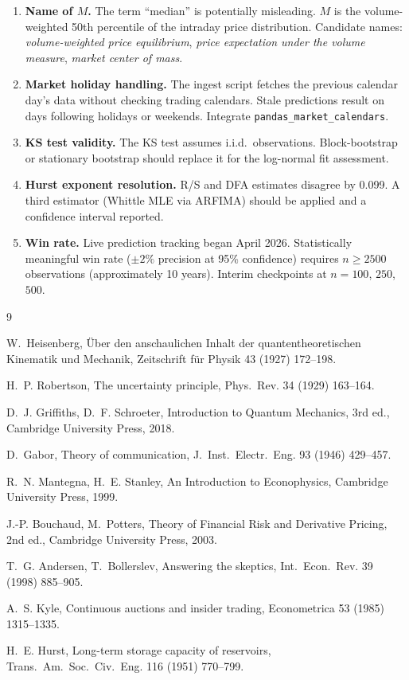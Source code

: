 \documentclass[preprint,12pt]{elsarticle}
\begin{document}
\begin{enumerate}
    \item \textbf{Name of $M$.} The term ``median'' is potentially misleading. $M$ is the volume-weighted 50th percentile of the intraday price distribution. Candidate names: \textit{volume-weighted price equilibrium}, \textit{price expectation under the volume measure}, \textit{market center of mass}.

    \item \textbf{Market holiday handling.} The ingest script fetches the previous calendar day's data without checking trading calendars. Stale predictions result on days following holidays or weekends. Integrate \texttt{pandas\_market\_calendars}.

    \item \textbf{KS test validity.} The KS test assumes i.i.d.\ observations. Block-bootstrap or stationary bootstrap should replace it for the log-normal fit assessment.

    \item \textbf{Hurst exponent resolution.} R/S and DFA estimates disagree by 0.099. A third estimator (Whittle MLE via ARFIMA) should be applied and a confidence interval reported.

    \item \textbf{Win rate.} Live prediction tracking began April 2026. Statistically meaningful win rate ($\pm 2\%$ precision at 95\% confidence) requires $n \geq 2500$ observations (approximately 10 years). Interim checkpoints at $n = 100$, $250$, $500$.
\end{enumerate}




\begin{thebibliography}{9}

W.~Heisenberg, \"{U}ber den anschaulichen Inhalt der quantentheoretischen Kinematik und Mechanik, Zeitschrift f\"{u}r Physik 43 (1927) 172--198.

H.~P. Robertson, The uncertainty principle, Phys.~Rev. 34 (1929) 163--164.

D.~J. Griffiths, D.~F. Schroeter, Introduction to Quantum Mechanics, 3rd ed., Cambridge University Press, 2018.

D.~Gabor, Theory of communication, J.~Inst.~Electr.~Eng. 93 (1946) 429--457.

R.~N. Mantegna, H.~E. Stanley, An Introduction to Econophysics, Cambridge University Press, 1999.

J.-P. Bouchaud, M.~Potters, Theory of Financial Risk and Derivative Pricing, 2nd ed., Cambridge University Press, 2003.

T.~G. Andersen, T.~Bollerslev, Answering the skeptics, Int.~Econ.~Rev. 39 (1998) 885--905.

A.~S. Kyle, Continuous auctions and insider trading, Econometrica 53 (1985) 1315--1335.

H.~E. Hurst, Long-term storage capacity of reservoirs, Trans.~Am.~Soc.~Civ.~Eng. 116 (1951) 770--799.

\end{thebibliography}
\end{document}
